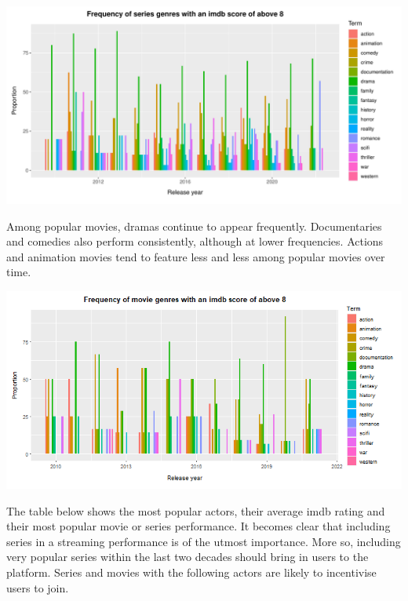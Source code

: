 \documentclass[11pt,preprint, authoryear]{elsarticle}
\let\origfigure\figure
\let\endorigfigure\endfigure
\renewenvironment{figure}[1][2] {
    \expandafter\origfigure\expandafter[H]
} {
    \endorigfigure
}
\numberwithin{equation}{section}
\numberwithin{figure}{section}
\numberwithin{table}{section}
\begin{document}
\begin{figure}[H]

{\centering \includegraphics{Question_4_files/figure-latex/Figure1-1} 

}

\caption{Frequency of genres among popular series  \label{Figure1}}\label{fig:Figure1}
\end{figure}

Among popular movies, dramas continue to appear frequently.
Documentaries and comedies also perform consistently, although at lower
frequencies. Actions and animation movies tend to feature less and less
among popular movies over time.

\begin{figure}[H]

{\centering \includegraphics{Question_4_files/figure-latex/Figure2-1} 

}

\caption{Frequency of genres among popular movies \label{Figure2}}\label{fig:Figure2}
\end{figure}

The table below shows the most popular actors, their average imdb rating
and their most popular movie or series performance. It becomes clear
that including series in a streaming performance is of the utmost
importance. More so, including very popular series within the last two
decades should bring in users to the platform. Series and movies with
the following actors are likely to incentivise users to join.
\end{document}

